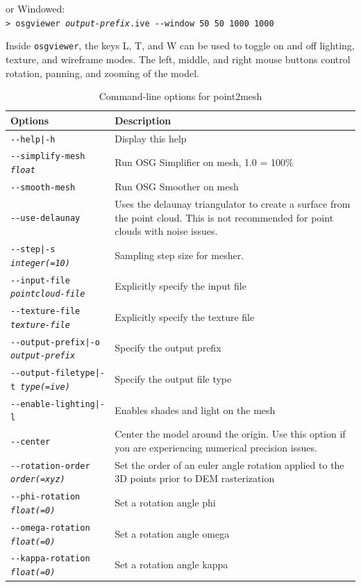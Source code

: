 \hspace*{2em}or Windowed:\\
\hspace*{2em}\texttt{> osgviewer \textit{output-prefix}.ive -\/-window 50 50 1000 1000}

Inside \texttt{osgviewer}, the keys L, T, and W can be used to toggle on
and off lighting, texture, and wireframe modes.  The left, middle, and
right mouse buttons control rotation, panning, and zooming of the
model.

\begin{longtable}{|l|p{10cm}|}
\caption{Command-line options for point2mesh}
\label{tbl:point2mesh}
\endfirsthead
\endhead
\endfoot
\endlastfoot
\hline
Options & Description \\ \hline \hline
\texttt{-\/-help|-h} & Display this help \\ \hline
\texttt{-\/-simplify-mesh \textit{float}} & Run OSG Simplifier on mesh, 1.0 = 100\% \\ \hline
\texttt{-\/-smooth-mesh} & Run OSG Smoother on mesh \\ \hline
\texttt{-\/-use-delaunay} & Uses the delaunay triangulator to create a surface from the point cloud. This is not recommended for point clouds with noise issues. \\ \hline
\texttt{-\/-step|-s \textit{integer(=10)}} & Sampling step size for mesher. \\ \hline
\texttt{-\/-input-file \textit{pointcloud-file}} & Explicitly specify the input file \\ \hline
\texttt{-\/-texture-file \textit{texture-file}} & Explicitly specify the texture file \\ \hline
\texttt{-\/-output-prefix|-o \textit{output-prefix}} & Specify the output prefix \\ \hline
\texttt{-\/-output-filetype|-t \textit{type(=ive)}} & Specify the output file type \\ \hline
\texttt{-\/-enable-lighting|-l} & Enables shades and light on the mesh \\ \hline
\texttt{-\/-center} & Center the model around the origin. Use this option if you are experiencing numerical precision issues. \\ \hline
\texttt{-\/-rotation-order \textit{order(=xyz)}} & Set the order of an euler angle rotation applied to the 3D points prior to DEM rasterization \\ \hline
\texttt{-\/-phi-rotation \textit{float(=0)}} & Set a rotation angle phi \\ \hline
\texttt{-\/-omega-rotation \textit{float(=0)}} & Set a rotation angle omega \\ \hline
\texttt{-\/-kappa-rotation \textit{float(=0)}} & Set a rotation angle kappa \\ \hline
\end{longtable}


